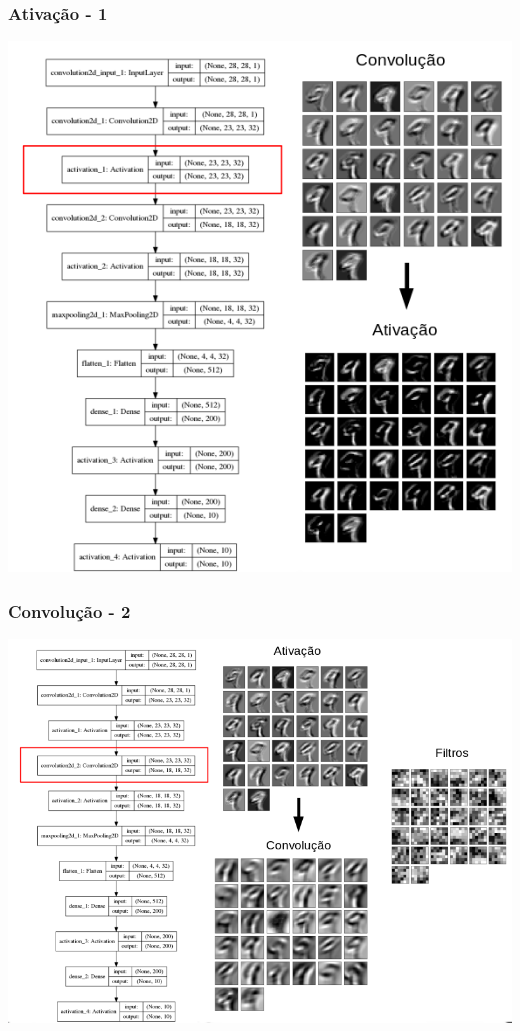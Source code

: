 \documentclass[tikz,11pt]{beamer}
\begin{document}
\begin{frame}
	\frametitle{Ativação - 1}
	\centering
	\includegraphics[height=.8\paperheight]{images/fabio/ativ_1}
\end{frame}

\begin{frame}
	\frametitle{Convolução - 2}
	\centering
	\includegraphics[width=.8\paperwidth]{images/fabio/conv_2}
\end{frame}
\end{document}
